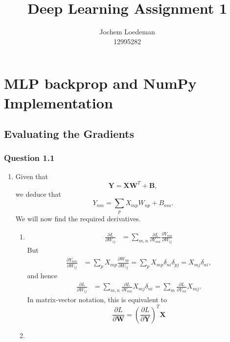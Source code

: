 \documentclass{article}
\title{Deep Learning Assignment 1}
\author{%
  Jochem Loedeman \\
  12995282
}
\renewcommand{\b}[1]{\boldsymbol{#1}}
\newcommand{\pfrac}[2]{\frac{\partial #1}{\partial #2}}
\begin{document}
\maketitle


\section{MLP backprop and NumPy Implementation}
\subsection{Evaluating the Gradients}
\subsubsection*{Question 1.1}
\begin{enumerate}[label=(\alph*)]
	\item 
	Given that
	$$
	\b Y = \b X \b W^T + \b B,
	$$ we deduce that
	$$
	Y_{nm} = \sum_p X_{mp}W_{np} + B_{nm}.
	$$ We will now find the required derivatives.
	\begin{enumerate}[label=(\roman*)]
	\item 
	$$
	\begin{aligned}
	\pfrac{L}{W_{ij}} &= \sum_{m, n}\pfrac{L}{Y_{mn}}\pfrac{Y_{nm}}{W_{ij}}
	\end{aligned}
	$$ But
	$$
	\begin{aligned}
	\pfrac{Y_{nm}}{W_{ij}} &= \sum_pX_{mp}\pfrac{W_{np}}{W_{ij}} = \sum_pX_{mp}\delta_{ni}\delta_{pj} = X_{mj}\delta_{ni},
	\end{aligned}
	$$ and hence
	$$
	\begin{aligned}
	\pfrac{L}{W_{ij}} &= \sum_{m, n}\pfrac{L}{Y_{mn}}X_{mj}\delta_{ni} = \sum_m \pfrac{L}{Y_{mi}}X_{mj}.
	\end{aligned}
	$$ In matrix-vector notation, this is equivalent to
	$$
	\pfrac{L}{\b W} = \left(\pfrac{L}{\b Y}\right)^T\b X
	$$
	\item
\end{enumerate}
\end{enumerate}
\end{document}
